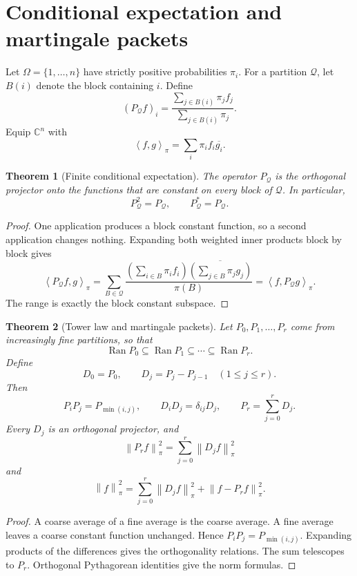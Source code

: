 \documentclass[11pt,a4paper]{article}
\newtheorem{theorem}{Theorem}[section]
\theoremstyle{definition}
\theoremstyle{remark}
\newcommand{\Ran}{\operatorname{Ran}}
\newcommand{\norm}[1]{\left\lVert#1\right\rVert}
\newcommand{\CC}{\mathbb C}
\newcommand{\ip}[2]{\left\langle#1,#2\right\rangle}
\begin{document}
\section{Conditional expectation and martingale packets}\label{extended:section:06}\label{extended:sec:conditional_expectation}

Let \(\Omega=\{1,\ldots,n\}\) have strictly positive probabilities \(\pi_i\). For a partition \(\mathcal Q\), let \(B(i)\) denote the block containing \(i\). Define
\[
(P_\mathcal Qf)_i
=
\frac{\sum_{j\in B(i)}\pi_jf_j}
{\sum_{j\in B(i)}\pi_j}.
\]
Equip \(\CC^n\) with
\[
\ip{f}{g}_\pi
=
\sum_i\pi_if_i\overline{g_i}.
\]

\begin{theorem}[Finite conditional expectation]\label{extended:record:036}\label{extended:thm:finite_conditional_expectation}
The operator \(P_\mathcal Q\) is the orthogonal projector onto the functions that are constant on every block of \(\mathcal Q\). In particular,
\[
P_\mathcal Q^2=P_\mathcal Q,
\qquad
P_\mathcal Q^*=P_\mathcal Q.
\]
\end{theorem}

\begin{proof}
One application produces a block constant function, so a second application changes nothing. Expanding both weighted inner products block by block gives
\[
\ip{P_\mathcal Qf}{g}_\pi
=
\sum_{B\in\mathcal Q}
\frac{
\left(\sum_{i\in B}\pi_if_i\right)
\overline{\left(\sum_{j\in B}\pi_jg_j\right)}
}{\pi(B)}
=
\ip{f}{P_\mathcal Qg}_\pi.
\]
The range is exactly the block constant subspace.
\end{proof}

\begin{theorem}[Tower law and martingale packets]\label{extended:record:037}\label{extended:thm:martingale_packets}
Let $P_0,P_1,\ldots,P_r$ come from increasingly fine partitions, so that
\[
\Ran P_0\subseteq\Ran P_1\subseteq\cdots\subseteq\Ran P_r.
\]
Define
\[
D_0=P_0,
\qquad
D_j=P_j-P_{j-1}
\quad(1\leq j\leq r).
\]
Then
\[
P_iP_j=P_{\min(i,j)},
\qquad
D_iD_j=\delta_{ij}D_j,
\qquad
P_r=\sum_{j=0}^rD_j.
\]
Every \(D_j\) is an orthogonal projector, and
\[
\norm{P_rf}_\pi^2
=
\sum_{j=0}^r\norm{D_jf}_\pi^2
\]
and
\[
\norm f_\pi^2
=
\sum_{j=0}^r\norm{D_jf}_\pi^2
+
\norm{f-P_rf}_\pi^2.
\]
\end{theorem}

\begin{proof}
A coarse average of a fine average is the coarse average. A fine average leaves a coarse constant function unchanged. Hence \(P_iP_j=P_{\min(i,j)}\). Expanding products of the differences gives the orthogonality relations. The sum telescopes to \(P_r\). Orthogonal Pythagorean identities give the norm formulas.
\end{proof}
\end{document}
